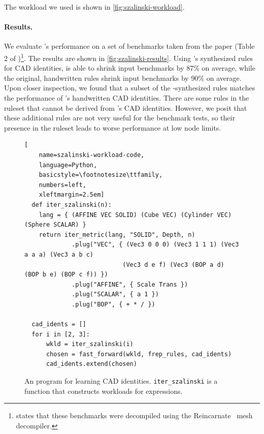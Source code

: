 The workload we used is shown in \autoref{fig:szalinski-workload}.

\paragraph*{Results.}
We evaluate \sz's performance
  on a set of
  benchmarks taken from the paper (Table 2 of \citealt{szalinski})\footnote{
    \citet{szalinski} states that
     these benchmarks were decompiled using the
     Reincarnate~\citep{reincarnate} mesh decompiler.}.
The results are shown in \autoref{fig:szalinski-results}.
Using \enumo's synthesized rules for CAD identities, \sz is able
  to shrink input benchmarks by 87\% on average, while the original, handwritten
  rules shrink input benchmarks by 90\% on average.
Upon closer inspection, we found that a subset of the \enumo-synthesized
  rules matches the performance of \sz's handwritten CAD identities.
There are some rules in the \enumo ruleset that
  cannot be derived from \sz's CAD identities.
However, we posit that these additional rules
  are not very useful for the \sz benchmark tests, so their
  presence in the \enumo ruleset leads to worse
  performance at low node limits.

\begin{figure}

  \begin{lstlisting}[
    name=szalinski-workload-code,
    language=Python,
    basicstyle=\footnotesize\ttfamily,
    numbers=left,
    xleftmargin=2.5em]
  def iter_szalinski(n):
    lang = { (AFFINE VEC SOLID) (Cube VEC) (Cylinder VEC) (Sphere SCALAR) }
    return iter_metric(lang, "SOLID", Depth, n)
             .plug("VEC", { (Vec3 0 0 0) (Vec3 1 1 1) (Vec3 a a a) (Vec3 a b c)
                           (Vec3 d e f) (Vec3 (BOP a d) (BOP b e) (BOP c f)) })
             .plug("AFFINE", { Scale Trans })
             .plug("SCALAR", { a 1 })
             .plug("BOP", { + * / })

  cad_idents = []
  for i in [2, 3]:
      wkld = iter_szalinski(i)
      chosen = fast_forward(wkld, frep_rules, cad_idents)
      cad_idents.extend(chosen)
  \end{lstlisting}
  \caption{
    An \enumo program for learning CAD identities. \texttt{iter_szalinski}
    is a function that constructs workloads for \Caddy expressions.
  }
  \label{fig:szalinski-workload}
  \label{fig:szalinski-recipe}
\end{figure}

